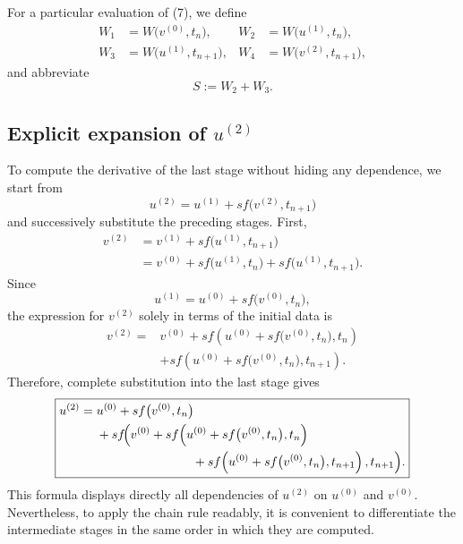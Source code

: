 \documentclass[11pt,a4paper]{article}
\begin{document}
For a particular evaluation of (7), we define
\begin{align*}
 W_1&=W\bigl(v^{(0)},t_n\bigr),
 &W_2&=W\bigl(u^{(1)},t_n\bigr),\\
 W_3&=W\bigl(u^{(1)},t_{n+1}\bigr),
 &W_4&=W\bigl(v^{(2)},t_{n+1}\bigr),
\end{align*}
and abbreviate
\[
 S:=W_2+W_3.
\]

\subsection*{Explicit expansion of \texorpdfstring{$u^{(2)}$}{u(2)}}

To compute the derivative of the last stage without hiding any dependence, we start from
\[
 u^{(2)}=u^{(1)}+s f\bigl(v^{(2)},t_{n+1}\bigr)
\]
and successively substitute the preceding stages. First,
\begin{align*}
 v^{(2)}
 &=v^{(1)}+s f\bigl(u^{(1)},t_{n+1}\bigr)\\
 &=v^{(0)}+s f\bigl(u^{(1)},t_n\bigr)
   +s f\bigl(u^{(1)},t_{n+1}\bigr).
\end{align*}
Since
\[
 u^{(1)}=u^{(0)}+s f\bigl(v^{(0)},t_n\bigr),
\]
the expression for $v^{(2)}$ solely in terms of the initial data is
\[
 \begin{aligned}
 v^{(2)}={}&v^{(0)}
 +s f\!\left(u^{(0)}+s f\bigl(v^{(0)},t_n\bigr),t_n\right)\\
 &+s f\!\left(u^{(0)}+s f\bigl(v^{(0)},t_n\bigr),t_{n+1}\right).
 \end{aligned}
\]
Therefore, complete substitution into the last stage gives
\[
 \boxed{
 \begin{aligned}
 u^{(2)}={}&u^{(0)}+s f\bigl(v^{(0)},t_n\bigr)\\
 &+s f\!\Bigl(
 v^{(0)}
 +s f\!\left(u^{(0)}+s f\bigl(v^{(0)},t_n\bigr),t_n\right)\\
 &\hspace{2.7cm}
 +s f\!\left(u^{(0)}+s f\bigl(v^{(0)},t_n\bigr),t_{n+1}\right),
 t_{n+1}\Bigr).
 \end{aligned}
 }
\]
This formula displays directly all dependencies of $u^{(2)}$ on $u^{(0)}$ and $v^{(0)}$.
Nevertheless, to apply the chain rule readably, it is convenient to differentiate the
intermediate stages in the same order in which they are computed.
\end{document}
